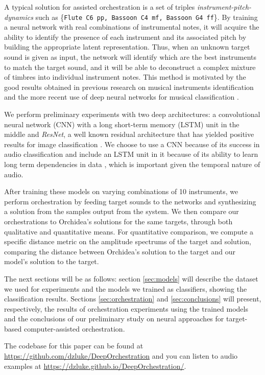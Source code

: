 \documentclass[runningheads,a4paper]{llncs}
\begin{document}
A typical solution for assisted orchestration is a set of triples \emph{instrument-pitch-dynamics} such as \{\texttt{Flute C6 pp, Bassoon C4 mf, Bassoon G4 ff}\}. By training a neural network with real combinations of instrumental notes, it will acquire the ability to identify the presence of each instrument and its associated pitch by building the appropriate latent representation. Thus, when an unknown target sound is given as input, the network will identify which are the best instruments to match the target sound, and it will be able to  deconstruct a complex mixture of timbres into individual instrument notes. This method is motivated by the good results obtained in previous research on musical instruments identification \cite{Benetos07, Kitahara05} and the more recent use of deep neural networks for musical classification \cite{lostanlen16, Bian19}.

We perform preliminary experiments with two deep architectures: a convolutional neural network (CNN) with a long short-term memory (LSTM) unit in the middle and \emph{ResNet}, a well known residual architecture that has yielded positive results for image classification \cite{He15}. We choose to use a CNN because of its success in audio classification \cite{Hershey17} and include an LSTM unit in it because of its ability to learn long term dependencies in data \cite{Hochreiter97}, which is important given the temporal nature of audio.

After training these models on varying combinations of 10 instruments, we perform orchestration by feeding target sounds to the networks and synthesizing a solution from the samples output from the system. We then compare our orchestrations to Orchidea's solutions for the same targets, through both qualitative and quantitative means. For quantitative comparison, we compute a specific distance metric on the amplitude spectrums of the target and solution, comparing the distance between Orchidea's solution to the target and our model's solution to the target.

The next sections will be as follows: section \ref{sec:models} will describe the dataset we used for experiments and the models we trained as classifiers, showing the classification results. Sections \ref{sec:orchestration} and \ref{sec:conclusions} will present, respectively, the results of orchestration experiments using the trained models and the conclusions of our preliminary study on neural approaches for target-based computer-assisted orchestration.

The codebase for this paper can be found at \url{https://github.com/dzluke/DeepOrchestration} and you can listen to audio examples at \url{https://dzluke.github.io/DeepOrchestration/}.
\end{document}
